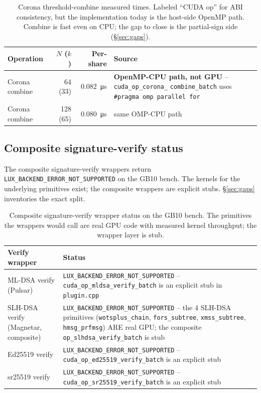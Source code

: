 \begin{table}[h]
\centering
\small
\begin{tabular}{@{}p{3cm}rrp{5cm}@{}}
\toprule
\textbf{Operation} & \textbf{$N$ ($k$)} & \textbf{Per-share}
  & \textbf{Source} \\
\midrule
Corona combine & 64 (33) & \SI{0.082}{\micro\second}
  & \textbf{OpenMP-CPU path, not GPU} --
  \texttt{cuda\_op\_corona\_} \texttt{combine\_batch} uses
  \texttt{\#pragma omp parallel for} \\
Corona combine & 128 (65) & \SI{0.080}{\micro\second}
  & same OMP-CPU path \\
\bottomrule
\end{tabular}
\caption{Corona threshold-combine measured times. Labeled
``CUDA op'' for ABI consistency, but the implementation today
is the host-side OpenMP path.
Combine is fast even on CPU; the gap to close is the partial-sign
side (\S\ref{sec:gaps}).}
\label{tab:corona-combine}
\end{table}

\subsection{Composite signature-verify status}

The composite signature-verify wrappers return
\texttt{LUX\_BACKEND\_ERROR\_NOT\_SUPPORTED} on the GB10 bench.
The kernels for the underlying primitives exist; the composite
wrappers are explicit stubs. \S\ref{sec:gaps} inventories the
exact split.

\begin{table}[h]
\centering
\small
\begin{tabular}{@{}p{3.5cm}p{8cm}@{}}
\toprule
\textbf{Verify wrapper} & \textbf{Status} \\
\midrule
ML-DSA verify (Pulsar) & \texttt{LUX\_BACKEND\_ERROR\_NOT\_SUPPORTED} --
  \texttt{cuda\_op\_mldsa\_verify\_batch} is an explicit stub in
  \texttt{plugin.cpp} \\
SLH-DSA verify (Magnetar, composite) &
  \texttt{LUX\_BACKEND\_ERROR\_NOT\_SUPPORTED} -- the 4 SLH-DSA
  primitives (\texttt{wotsplus\_chain}, \texttt{fors\_subtree},
  \texttt{xmss\_subtree}, \texttt{hmsg\_prfmsg}) ARE real GPU;
  the composite \texttt{op\_slhdsa\_verify\_batch} is stub \\
Ed25519 verify & \texttt{LUX\_BACKEND\_ERROR\_NOT\_SUPPORTED} --
  \texttt{cuda\_op\_ed25519\_verify\_batch} is an explicit stub \\
sr25519 verify & \texttt{LUX\_BACKEND\_ERROR\_NOT\_SUPPORTED} --
  \texttt{cuda\_op\_sr25519\_verify\_batch} is an explicit stub \\
\bottomrule
\end{tabular}
\caption{Composite signature-verify wrapper status on the GB10
bench. The primitives the wrappers would call are real GPU code
with measured kernel throughput; the wrapper layer is stub.}
\label{tab:composite-status}
\end{table}

